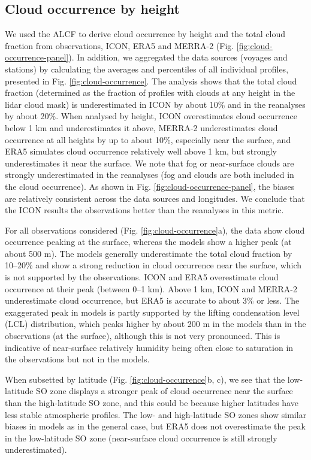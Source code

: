 \documentclass[12pt,a4paper]{article}
\begin{document}
\subsection{Cloud occurrence by height}
\label{sec:cloud-occurrence}

We used the ALCF to derive cloud occurrence by height and the total cloud
fraction from observations, ICON, ERA5 and MERRA-2 (Fig.
\ref{fig:cloud-occurrence-panel}). In addition, we aggregated the data sources
(voyages and stations) by calculating the averages and percentiles of all
individual profiles, presented in Fig. \ref{fig:cloud-occurrence}. The analysis
shows that the total cloud fraction (determined as the fraction of profiles
with clouds at any height in the lidar cloud mask) is underestimated in ICON by
about 10\% and in the reanalyses by about 20\%. When analysed by height, ICON
overestimates cloud occurrence below 1 km and underestimates it above, MERRA-2
underestimates cloud occurrence at all heights by up to about 10\%, especially
near the surface, and ERA5 simulates cloud occurrence relatively well above 1
km, but strongly underestimates it near the surface.  We note that fog or
near-surface clouds are strongly underestimated in the reanalyses (fog and
clouds are both included in the cloud occurrence).  As shown in Fig.
\ref{fig:cloud-occurrence-panel}, the biases are relatively consistent across
the data sources and longitudes. We conclude that the ICON results  the
observations better than the reanalyses in this metric.

For all observations considered (Fig. \ref{fig:cloud-occurrence}a), the data
show cloud occurrence peaking at the surface, whereas the models show a higher
peak (at about 500 m). The models generally underestimate the total cloud
fraction by 10--20\% and show a strong reduction in cloud occurrence near the
surface, which is not supported by the observations. ICON and ERA5 overestimate
cloud occurrence at their peak (between 0--1 km). Above 1 km, ICON and MERRA-2
underestimate cloud occurrence, but ERA5 is accurate to about 3\% or less. The
exaggerated peak in models is partly supported by the lifting condensation
level (LCL) distribution, which peaks higher by about 200 m in the models than
in the observations (at the surface), although this is not very pronounced.
This is indicative of near-surface relatively humidity being often close to
saturation in the observations but not in the models.

When subsetted by latitude (Fig.  \ref{fig:cloud-occurrence}b, c), we see that
the low-latitude SO zone displays a stronger peak of cloud occurrence near the
surface than the high-latitude SO zone, and this could be because higher
latitudes have less stable atmospheric profiles. The low- and high-latitude SO
zones show similar biases in models as in the general case, but ERA5 does not
overestimate the peak in the low-latitude SO zone (near-surface cloud
occurrence is still strongly underestimated).
\end{document}
